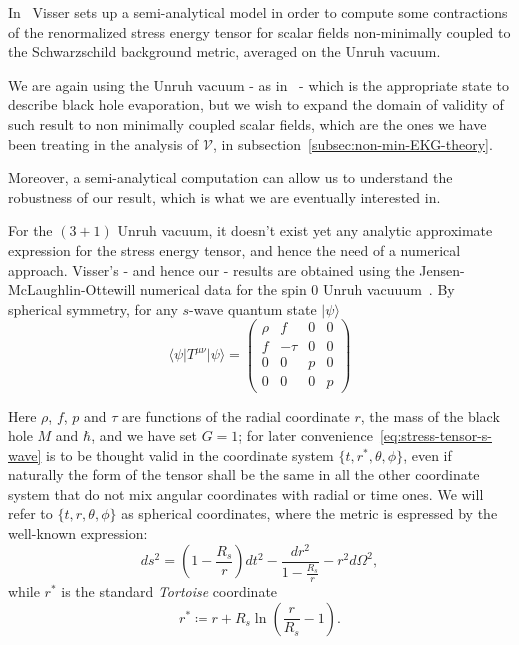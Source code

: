 In~\cite[]{visser1997gravitational} Visser sets up a semi-analytical model in order to compute some contractions of the renormalized stress energy tensor for scalar fields non-minimally coupled to the Schwarzschild background metric, averaged on the Unruh vacuum.

We are again using the Unruh vacuum - as in~\cite[]{levi2016versatile} - which is the appropriate state to describe black hole evaporation, but we wish to expand the domain of validity of such result to non minimally coupled scalar fields, which are the ones we have been treating in the analysis of \(\mathcal{V}\), in subsection~\ref{subsec:non-min-EKG-theory}.

Moreover, a semi-analytical computation can allow us to understand the robustness of our result, which is what we are eventually interested in.

For the \((3 + 1)\) Unruh vacuum, it doesn't exist yet any analytic approximate expression for the stress energy tensor, and hence the need of a numerical approach. Visser's - and hence our - results are obtained using the Jensen-McLaughlin-Ottewill numerical data for the spin \(0\) Unruh vacuuum~\cite[]{jensen1991renormalized}. By spherical symmetry, for any \(s\)-wave quantum state \(\vert \psi\rangle\) 
\begin{equation}
    \label{eq:stress-tensor-s-wave}
    \langle\psi\vert T^{\mu\nu}\vert\psi\rangle = \begin{pmatrix}
        \rho & f & 0 & 0 \\
        f & -\tau & 0 & 0 \\
        0 & 0 & p & 0 \\
        0 & 0 & 0 & p
    \end{pmatrix}
\end{equation}

Here \(\rho\), \(f\), \(p\) and  \(\tau\) are functions of the radial coordinate \(r\), the mass of the black hole \(M\) and \(\hbar\), and we have set \(G = 1\); for later convenience~\eqref{eq:stress-tensor-s-wave} is to be thought valid in the coordinate system \(\{t, r^*, \theta, \phi\}\), even if naturally the form of the tensor shall be the same in all the other coordinate system that do not mix angular coordinates with radial or time ones. We will refer to \(\{t, r, \theta, \phi\}\) as spherical coordinates, where the metric is espressed by the well-known expression:
\[
ds^2 =  \left(1 - \frac{R_s}{r}\right)dt^2  - \frac{dr^2}{1 - \frac{R_s}{r}} - r^2d\Omega^2,
\]
while \(r^*\) is the standard \emph{Tortoise} coordinate
\[
r^* \coloneqq r + R_s\ln\left(\frac{r}{R_s} - 1\right).    
\]

